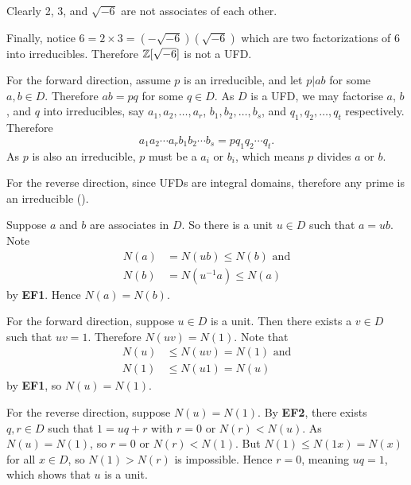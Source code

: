 \begin{questions}
    Clearly 2, 3, and $\sqrt{-6}$ are not associates of each other.

    Finally, notice $6 = 2 \times 3 = (-\sqrt{-6})(\sqrt{-6})$ which are two factorizations of 6 into irreducibles. Therefore $\mathbb{Z}[\sqrt{-6}]$ is not a UFD.

    \item For the forward direction, assume $p$ is an irreducible, and let $p \vert ab$ for some $a,b \in D$. Therefore $ab = pq$ for some $q \in D$. As $D$ is a UFD, we may factorise $a$, $b$, and $q$ into irreducibles, say $a_1, a_2, \dots, a_r$, $b_1, b_2, \dots, b_s$, and $q_1, q_2, \dots, q_t$ respectively. Therefore
    \[
        a_1a_2\cdots a_r b_1b_2\cdots b_s = p q_1q_2\cdots q_t.
    \]
    As $p$ is also an irreducible, $p$ must be a $a_i$ or $b_i$, which means $p$ divides $a$ or $b$.

    For the reverse direction, since UFDs are integral domains, therefore any prime is an irreducible ().

    \item \begin{partquestions}{\alph*}
        \item Suppose $a$ and $b$ are associates in $D$. So there is a unit $u \in D$ such that $a = ub$. Note
        \begin{align*}
            N(a) &= N(ub) \leq N(b) \text{ and}\\
            N(b) &= N(u^{-1}a) \leq N(a)
        \end{align*}
        by \textbf{EF1}. Hence $N(a) = N(b)$.

        \item For the forward direction, suppose $u \in D$ is a unit. Then there exists a $v \in D$ such that $uv = 1$. Therefore $N(uv) = N(1)$. Note that
        \begin{align*}
            N(u) &\leq N(uv) = N(1) \text{ and}\\
            N(1) &\leq N(u1) = N(u)
        \end{align*}
        by \textbf{EF1}, so $N(u) = N(1)$.

        For the reverse direction, suppose $N(u) = N(1)$. By \textbf{EF2}, there exists $q, r \in D$ such that $1 = uq + r$ with $r = 0$ or $N(r) < N(u)$. As $N(u) = N(1)$, so $r = 0$ or $N(r) < N(1)$. But $N(1) \leq N(1x) = N(x)$ for all $x \in D$, so $N(1) > N(r)$ is impossible. Hence $r = 0$, meaning $uq = 1$, which shows that $u$ is a unit.
    \end{partquestions}


\end{questions}
